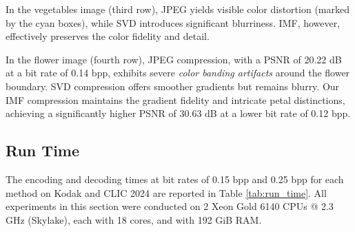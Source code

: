 In the vegetables image (third row), JPEG yields visible color distortion (marked by the cyan boxes), while SVD introduces significant blurriness. IMF, however, effectively preserves the color fidelity and detail.

In the flower image (fourth row), JPEG compression, with a PSNR of 20.22 dB at a bit rate of 0.14 bpp, exhibits severe \emph{color banding artifacts} around the flower boundary. SVD compression offers smoother gradients but remains blurry. Our IMF compression maintains the gradient fidelity and intricate petal distinctions, achieving a significantly higher PSNR of 30.63 dB at a lower bit rate of 0.12 bpp.


\subsection{Run Time} \label{sec:run_time}
The encoding and decoding times  at bit rates of 0.15 bpp and 0.25 bpp for each method on Kodak and CLIC 2024 are reported in Table \ref{tab:run_time}. All experiments in this section were conducted on 2 Xeon Gold 6140 CPUs @ 2.3 GHz (Skylake), each with 18 cores, and with 192 GiB RAM.

